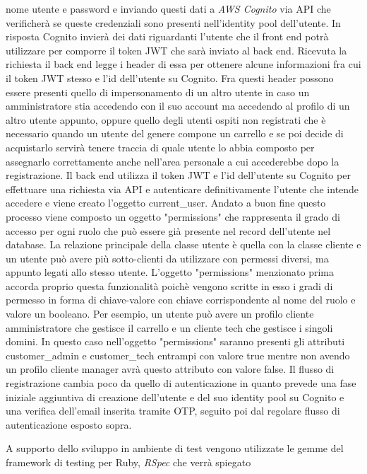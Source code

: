 \documentclass[target=bach,aauheader=,style=]{thud}
\begin{document}
nome utente e password e inviando questi dati a \textit{AWS Cognito} via API che verificherà se queste credenziali sono presenti nell'identity pool dell'utente.
In risposta Cognito invierà dei dati riguardanti l'utente che il front end potrà utilizzare per comporre il token JWT che sarà inviato al back end.
Ricevuta la richiesta il back end legge i header di essa per ottenere alcune informazioni fra cui il token JWT stesso e l'id dell'utente su Cognito.
Fra questi header possono essere presenti quello di impersonamento di un altro utente in caso un amministratore stia accedendo con il suo account ma accedendo al profilo
di un altro utente appunto, oppure quello degli utenti ospiti non registrati che è necessario quando un utente del genere compone un carrello e se poi decide di acquistarlo
servirà tenere traccia di quale utente lo abbia composto per assegnarlo correttamente anche nell'area personale a cui accederebbe dopo la registrazione.
Il back end utilizza il token JWT e l'id dell'utente su Cognito per effettuare una richiesta via API e autenticare definitivamente l'utente che intende accedere
e viene creato l'oggetto current\_user. Andato a buon fine questo processo viene composto un oggetto "permissions" che rappresenta il grado di accesso per ogni ruolo che può essere
già presente nel record dell'utente nel database. La relazione principale della classe utente è quella con la classe cliente e un utente può avere più sotto-clienti
da utilizzare con permessi diversi, ma appunto legati allo stesso utente. L'oggetto "permissions" menzionato prima accorda proprio questa funzionalità poichè vengono
scritte in esso i gradi di permesso in forma di chiave-valore con chiave corrispondente al nome del ruolo e valore un booleano. Per esempio, un utente può avere un profilo
cliente amministratore che gestisce il carrello e un cliente tech che gestisce i singoli domini. In questo caso nell'oggetto "permissions" saranno presenti gli attributi
customer\_admin e customer\_tech entrampi con valore true mentre non avendo un profilo cliente manager avrà questo attributo con valore false.
Il flusso di registrazione cambia poco da quello di autenticazione in quanto prevede una fase iniziale aggiuntiva di creazione dell'utente e del suo identity pool su Cognito
e una verifica dell'email inserita tramite OTP, seguito poi dal regolare flusso di autenticazione esposto sopra.
\par A supporto dello sviluppo in ambiente di test vengono utilizzate le gemme del framework di testing per Ruby, \textit{RSpec}\cite{rspec_home} che verrà spiegato
\end{document}
